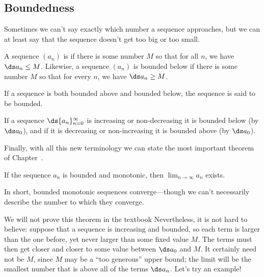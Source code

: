\subsection{Boundedness}
\label{subsection:boundedness}

Sometimes we can't say exactly which number a sequence approaches, but
we can at least say that the sequence doesn't get too big or too
small.

\begin{definition}
  A sequence $(a_n)$ is  if there is some number
$M$ so that for all $n$, we have $\ds a_n\le M$.  Likewise, a sequence
$(a_n)$ is {\dfont bounded below\/} if
there is some number $M$ so that for every $n$, we have $\ds a_n\ge M$.

If a sequence is both bounded above and bounded below, the sequence is said
to be {\dfont bounded\/}.
\end{definition}

If a sequence $\ds
\{a_n\}_{n=0}^\infty$ is increasing or non-decreasing it is bounded
below (by $\ds a_0$), and if it is decreasing or non-increasing it is
bounded above (by $\ds a_0$).

Finally, with all this new terminology we can state the most important
theorem of Chapter~.

\begin{theorem} If the sequence $a_n$ is bounded and monotonic, then
  $\lim_{n \to \infty} a_n$ exists.  \label{thm:bounded-monotonic}
\end{theorem}
In short, bounded monotonic sequences converge---though we can't
necessarily describe the number to which they converge.

We will not prove this theorem in the textbook Nevertheless,
it is not hard to believe: suppose that a sequence is increasing and
bounded, so each term is larger than the one before, yet never larger
than some fixed value $M$. The terms must then get closer and closer
to some value between $\ds a_0$ and $M$. It certainly need not be $M$,
since $M$ may be a ``too generous'' upper bound; the limit will be the
smallest number that is above all of the terms
$\ds a_n$.  Let's try an example!

